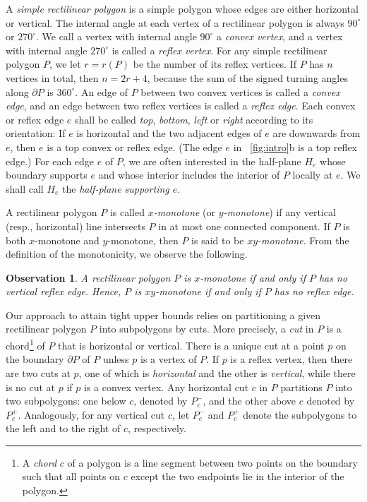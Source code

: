 \documentclass[11pt]{article}
\newcommand{\bd}{\ensuremath{\partial}}
\newtheorem{observation}{Observation}
\theoremstyle{definition}
\begin{document}
A \emph{simple rectilinear polygon} is a simple polygon whose edges are either horizontal or vertical.
The internal angle at each vertex of a rectilinear polygon is always $90^\circ$ or $270^\circ$.
We call a vertex with internal angle $90^\circ$ a \emph{convex vertex}, and a vertex with internal 
angle $270^\circ$ is called a \emph{reflex vertex}.
For any simple rectilinear polygon $P$, we let $r = r(P)$ be the number of its reflex vertices.
If $P$ has $n$ vertices in total, then $n = 2r + 4$, because the sum of the signed turning angles
along $\bd P$ is $360^\circ$.
An edge of $P$ between two  convex vertices is called a \emph{convex edge},
and an edge between two reflex vertices is called a \emph{reflex edge}.
Each convex or reflex edge $e$ shall be called \emph{top}, \emph{bottom}, \emph{left} or \emph{right}
according to its orientation:
If $e$ is horizontal and the two adjacent edges of $e$ are downwards from $e$,
then $e$ is a top convex or reflex edge.
(The edge $e$ in \figurename~\ref{fig:intro}b is a top reflex edge.)
For each edge $e$ of $P$, we are often interested in the half-plane $H_e$
whose boundary supports $e$ and whose interior includes the interior of $P$ locally at $e$.
We shall call $H_e$ the \emph{half-plane supporting $e$}.

A rectilinear polygon $P$ is called \emph{$x$-monotone} (or \emph{$y$-monotone})
if any vertical (resp., horizontal) line intersects $P$ in at most one connected component.
If $P$ is both $x$-monotone and $y$-monotone, then $P$ is said to be \emph{$xy$-monotone}.
From the definition of the monotonicity,
we observe the following.
\begin{observation} \label{obs:monotone}
A rectilinear polygon $P$ is $x$-monotone if and only if $P$ has no vertical reflex edge.
Hence, $P$ is $xy$-monotone if and only if $P$ has no reflex edge.
\end{observation}

Our approach to attain  tight upper bounds relies on
partitioning a given rectilinear polygon $P$ into subpolygons by cuts.
More precisely, a \emph{cut} in $P$ is a chord\footnote{A \emph{chord} $c$ of a polygon is a line segment between two points on the boundary
such that all points on $c$ except the two endpoints lie in the interior of the polygon.}
of $P$ that is horizontal or vertical.
There is a unique cut at a point $p$ on the boundary $\bd P$ of $P$
unless $p$ is a vertex of $P$.
If $p$ is a reflex vertex, then there are two cuts at $p$,
one of which is \emph{horizontal} and the other is \emph{vertical},
while there is no cut at $p$ if $p$ is a convex vertex.
Any horizontal cut $c$ in $P$ partitions $P$ into two subpolygons:
one below $c$, denoted by $P_c^-$, and the other above $c$ denoted by $P_c^+$.
Analogously, for any vertical cut $c$,
let $P_c^-$ and $P_c^+$ denote the subpolygons to the left and to the right of $c$, respectively.
\end{document}
